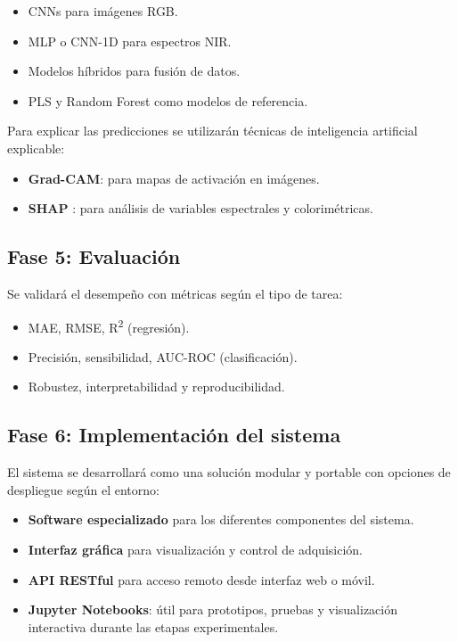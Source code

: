 \begin{itemize}
    \item CNNs para imágenes RGB.
    \item MLP o CNN-1D para espectros NIR.
    \item Modelos híbridos para fusión de datos.
    \item PLS y Random Forest como modelos de referencia.
\end{itemize}

Para explicar las predicciones se utilizarán técnicas de inteligencia artificial explicable:

\begin{itemize}
    \item \textbf{Grad-CAM}: para mapas de activación en imágenes.
    \item \textbf{SHAP} \parencite{lundberg_unified_2017}: para análisis de variables espectrales y colorimétricas.
\end{itemize}

\subsection{Fase 5: Evaluación}

Se validará el desempeño con métricas según el tipo de tarea:

\begin{itemize}
    \item MAE, RMSE, R\textsuperscript{2} (regresión).
    \item Precisión, sensibilidad, AUC-ROC (clasificación).
    \item Robustez, interpretabilidad y reproducibilidad.
\end{itemize}

\subsection{Fase 6: Implementación del sistema}

El sistema se desarrollará como una solución modular y portable con opciones de despliegue según el entorno:

\begin{itemize}
    \item \textbf{Software especializado} para los diferentes componentes del sistema.
    \item \textbf{Interfaz gráfica} para visualización y control de adquisición.
    \item \textbf{API RESTful} para acceso remoto desde interfaz web o móvil.
    \item \textbf{Jupyter Notebooks}: útil para prototipos, pruebas y visualización interactiva durante las etapas experimentales.
\end{itemize}